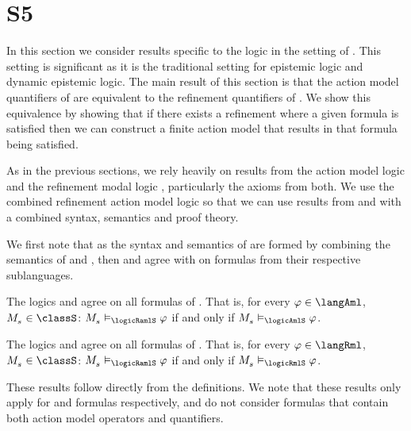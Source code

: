 \section{S5}\label{aaml-s5}

In this section we consider results specific to the logic \logicAamlS{} in the setting of \classS{}.
This setting is significant as it is the traditional setting for epistemic logic and dynamic epistemic logic.
The main result of this section is that the action model quantifiers of \logicAamlS{} are equivalent to the refinement quantifiers of \logicRmlS{}.
We show this equivalence by showing that if there exists a refinement where a given formula is satisfied then we can construct a finite action model that results in that formula being satisfied.

As in the previous sections, we rely heavily on results from the action model logic \logicAmlS{} and the refinement modal logic \logicRmlS{}, particularly the axioms from both.
We use the combined refinement action model logic \logicRamlS{} so that we can use results from \logicAmlS{} and \logicRmlS{} with a combined syntax, semantics and proof theory.

We first note that as the syntax and semantics of \logicRamlS{} are formed by combining the semantics of \logicAmlS{} and \logicRmlS{}, then \logicAmlS{} and \logicRmlS{} agree with \logicRamlS{} on formulas from their respective sublanguages.

\begin{lemma}\label{raml-s5-aml}
The logics \logicRamlS{} and \logicAmlS{} agree on all formulas of \langAml{}.
That is, for every $\phi \in \langAml$, $\kPModel{\kStateS} \in \classS$: $\kPModel{\kStateS} \entails_\logicRamlS \phi$ if and only if $\kPModel{\kStateS} \entails_\logicAmlS \phi$.
\end{lemma}

\begin{lemma}\label{raml-s5-rml}
The logics \logicRamlS{} and \logicAmlS{} agree on all formulas of \langRml{}.
That is, for every $\phi \in \langRml$, $\kPModel{\kStateS} \in \classS$: $\kPModel{\kStateS} \entails_\logicRamlS \phi$ if and only if $\kPModel{\kStateS} \entails_\logicRmlS \phi$.
\end{lemma}

These results follow directly from the definitions.
We note that these results only apply for \langAml{} and \langRml{} formulas respectively, and do not consider \langAaml{} formulas that contain both action model operators and quantifiers. 

